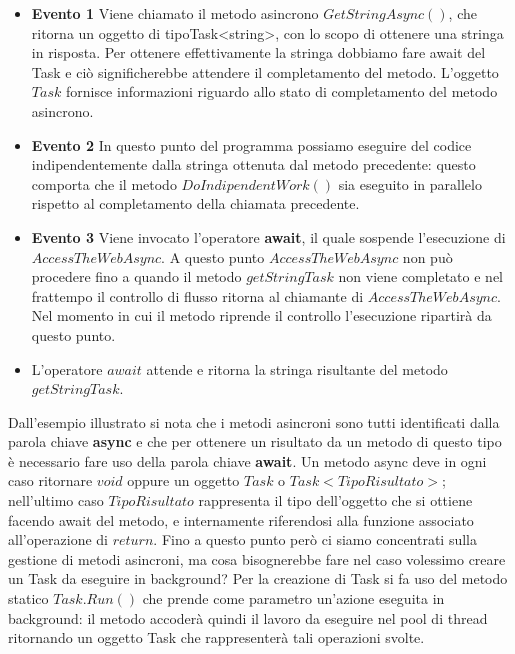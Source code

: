 \documentclass[a4]{book}
\begin{document}
\begin{itemize}
	\item{\textbf{Evento 1}}
	Viene chiamato il metodo asincrono $GetStringAsync()$, che ritorna un oggetto di tipoTask<string>, con lo scopo di ottenere una stringa in risposta. Per ottenere effettivamente la stringa dobbiamo fare await del Task e ciò significherebbe attendere il completamento del metodo.
	L'oggetto $Task$ fornisce informazioni riguardo allo stato di completamento del metodo asincrono.
	\item{\textbf{Evento 2}}
	In questo punto del programma possiamo eseguire del codice indipendentemente dalla stringa ottenuta dal metodo precedente: questo comporta che il metodo $DoIndipendentWork()$ sia eseguito in parallelo rispetto al completamento della chiamata precedente.
	\item{\textbf{Evento 3}}
	Viene invocato l'operatore \textbf{await}, il quale sospende l'esecuzione di $AccessTheWebAsync$. A questo punto $AccessTheWebAsync$ non può procedere fino a quando il metodo $getStringTask$ non viene completato e nel frattempo il controllo di flusso ritorna al chiamante di $AccessTheWebAsync$. Nel momento in cui il metodo riprende il controllo l'esecuzione ripartirà da questo punto. \newline
	\item L'operatore $await$ attende e ritorna la stringa risultante del metodo $getStringTask$.
\end{itemize}
Dall'esempio illustrato si nota che i metodi asincroni sono tutti identificati dalla parola chiave \textbf{async} e che per ottenere un risultato da un metodo di questo tipo è necessario fare uso della parola chiave \textbf{await}.\newline
Un metodo async deve in ogni caso ritornare $void$ oppure un oggetto $Task$ o $Task<TipoRisultato>$; nell'ultimo caso $TipoRisultato$ rappresenta il tipo dell'oggetto che si ottiene facendo await del metodo, e internamente riferendosi alla funzione associato all'operazione di $return$.\newline\newline
Fino a questo punto però ci siamo concentrati sulla gestione di metodi asincroni, ma cosa bisognerebbe fare nel caso volessimo creare un Task da eseguire in background? Per la creazione di Task si fa uso del metodo statico $Task.Run()$ che prende come parametro un'azione eseguita in background: il metodo accoderà quindi il lavoro da eseguire nel pool di thread ritornando un oggetto Task che rappresenterà tali operazioni svolte.\newline
\end{document}
